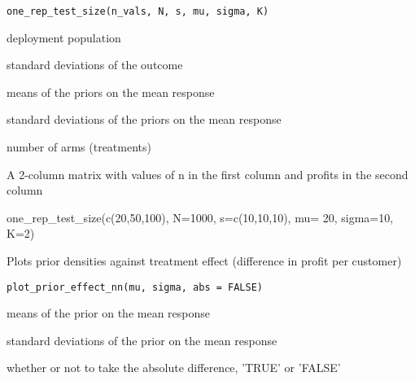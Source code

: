 \documentclass[a4paper]{book}
\begin{document}
%
\begin{Usage}
\begin{verbatim}
one_rep_test_size(n_vals, N, s, mu, sigma, K)
\end{verbatim}
\end{Usage}
%
\begin{Arguments}
\begin{ldescription}
\item[\code{N}] deployment population

\item[\code{s}] standard deviations of the outcome

\item[\code{mu}] means of the priors on the mean response

\item[\code{sigma}] standard deviations of the priors on the mean response

\item[\code{K}] number of arms (treatments)
\end{ldescription}
\end{Arguments}
%
\begin{Value}
A 2-column matrix with values of n in the first column and profits in the second column
\end{Value}
%
\begin{Examples}
\begin{ExampleCode}
one_rep_test_size(c(20,50,100), N=1000, s=c(10,10,10), mu= 20, sigma=10, K=2)
\end{ExampleCode}
\end{Examples}
%
\begin{Description}\relax
Plots prior densities against treatment effect (difference in profit per customer)
\end{Description}
%
\begin{Usage}
\begin{verbatim}
plot_prior_effect_nn(mu, sigma, abs = FALSE)
\end{verbatim}
\end{Usage}
%
\begin{Arguments}
\begin{ldescription}
\item[\code{mu}] means of the prior on the mean response

\item[\code{sigma}] standard deviations of the prior on the mean response

\item[\code{abs}] whether or not to take the absolute difference, 'TRUE' or 'FALSE'
\end{ldescription}
\end{Arguments}
\end{document}
